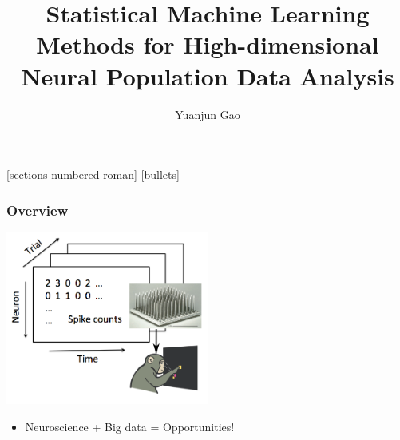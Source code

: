 \documentclass[16pt,presentation]{beamer}
\author[Yuanjun Gao]{Yuanjun Gao}
\institute{\small Department of Statistics\\ Columbia University}
\title[Department of Statistics, Columbia University]{\large Statistical Machine Learning Methods for High-dimensional Neural Population Data Analysis}
\date{}
\begin{document}

\beamertemplatetransparentcovereddynamicmedium
{}[sections numbered roman]
[bullets]


\begin{frame}\vspace*{1.5cm}
\maketitle
\begin{center}
\vspace{-1cm}
\end{center}
\end{frame}




\begin{frame}
\frametitle{Overview}
\centering
\includegraphics[width = 0.50\textwidth]{./figs/gclds/fig_monkey.png}
\begin{itemize}
\item Neuroscience + Big data = \alert{Opportunities}!
\end{itemize}
\end{frame}
\end{document}
